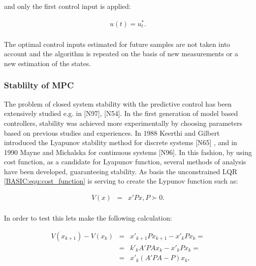 		and only the first control input is applied:
		
		\begin{equation}
        \begin{array}{rcl}
				u(t)=u^*_t.\\
        \end{array}
        \label{BASIC:equ:receiding_optimal_first}
    \end{equation}
		
		The optimal control inputs estimated for future samples are not taken into account and the algorithm is
repeated on the basis of new measurements or a new estimation of the states.

\subsubsection{Stablilty of MPC}		
	
	The problem of closed system stability with the predictive control has been extensively studied e.g. in [N97], [N54]. In the first generation of model based controllers, stability was achieved more experimentally by choosing parameters based on previous studies and experiences. In 1988 Keerthi and Gilbert introduced the Lyapunov stability method for discrete systems [N65] , and in 1990 Mayne and Michalska for continuous systems [N96]. In this fashion, by using cost function, as a candidate for Lyapunov function, several methods of analysis have been developed, guaranteeing stability. 
	As basis the unconstrained LQR \ref{BASIC:equ:cost_function} is serving to create the Lypunov function such as:
	
\begin{equation}
        \begin{array}{rcl}
				V(x)&=&x'Px, P\succ 0.\\
        \end{array}
        \label{BASIC:equ:stability_Lyapunov_1}
    \end{equation}
		
	In order to test this lets make the following calculation:
	
	\begin{equation}
        \begin{array}{rcl}
				V(x_{k+1})-V(x_{k})&=&x'_{k+1}Px_{k+1}-x'_{k}Px_{k}=\\
				&=&k'_kA'PAx_k-x'_kPx_k=\\
				&=&x'_k(A'PA-P)x_k,\\
        \end{array}
        \label{BASIC:equ:stability_Lyapunov_2}
    \end{equation}
		
